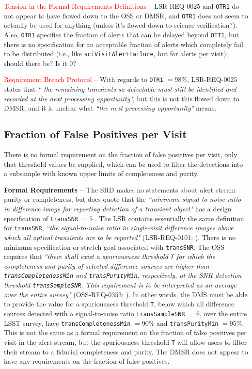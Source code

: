 \documentclass[DM,authoryear,toc]{lsstdoc}
\begin{document}
\textcolor{red}{Tension in the Formal Requirements Definitions --} LSR-REQ-0025 and {\tt OTR1} do not appear to have flowed down to the OSS or DMSR, and {\tt OTR1} does not seem to actually be used for anything (unless it's flowed down to science verification?). Also, {\tt OTR1} specifies the fraction of alerts that can be delayed beyond {\tt OTT1}, but there is no specification for an acceptable fraction of alerts which completely fail to be distributed (i.e., like {\tt sciVisitAlertFailure}, but for alerts per visit); should there be? Is it $0$?

\textcolor{red}{Requirement Breach Protocol --} With regards to {\tt OTR1} $=98\%$, LSR-REQ-0025 states that {\it `` the remaining transients so detectable must still be identified and recorded at the next processing opportunity"}, but this is not this flowed down to DMSR, and it is unclear what {\it ``the next processing opportunity"} means.


\subsection{Fraction of False Positives per Visit}\label{ssec:false_positives}

There is no formal requirement on the fraction of false positives per visit, only that threshold values be supplied, which can be used to filter the detections into a subsample with known upper limits of completeness and purity.

{\bf Formal Requirements --} The SRD makes no statements about alert stream purity or completeness, but does quote that the {\it ``minimum signal-to-noise ratio in difference image for reporting detection of a transient object"} has a design specification of {\tt transSNR} $=5$ . The LSR contains essentially the same definition for {\tt transSNR}, {\it ``the signal-to-noise ratio in single-visit difference images above which all optical transients are to be reported"} (LSR-REQ-0101; ). There is no minimum specification or stretch goal associated with {\tt transSNR}. The OSS requires that {\it ``there shall exist a spuriousness threshold {\tt T} for which the completeness and purity of selected difference sources are higher than {\tt transCompletenessMin} and {\tt transPurityMin}, respectively, at the SNR detection threshold {\tt transSampleSNR}. This requirement is to be interpreted as an average over the entire survey"} (OSS-REQ-0353; ). In other words, the DMS must be able to provide the value for a spuriousness threshold {\tt T}, below which all difference sources detected with a signal-to-noise ratio {\tt transSampleSNR} $=6$, over the entire LSST survey, have {\tt transCompletenessMin} $=90\%$ and {\tt transPurityMin} $=95\%$. This is not the same as a formal requirement on the fraction of false positives per visit in the alert stream, but the spuriousness threshold {\tt T} will allow users to filter their stream to a fiducial completeness and purity. The DMSR does not appear to have any requirements on the fraction of false positives. 
\end{document}
